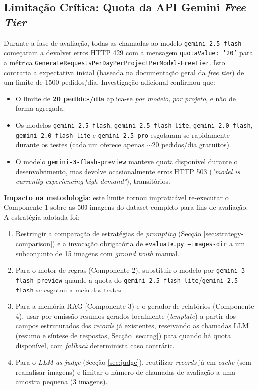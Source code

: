 \documentclass[conference]{IEEEtran}
\begin{document}
\subsection{Limitação Crítica: Quota da API Gemini \textit{Free Tier}}
\label{sec:quota}

Durante a fase de avaliação, todas as chamadas ao modelo
\texttt{gemini-2.5-flash} começaram a devolver erros HTTP 429 com a
mensagem \texttt{quotaValue: '20'} para a métrica
\texttt{GenerateRequestsPerDayPerProjectPerModel-FreeTier}. Isto contraria a
expectativa inicial (baseada na documentação geral da \textit{free tier}) de
um limite de 1500 pedidos/dia. Investigação adicional confirmou que:

\begin{itemize}
  \item O limite de \textbf{20 pedidos/dia} aplica-se \textit{por modelo, por
  projeto}, e não de forma agregada.
  \item Os modelos \texttt{gemini-2.5-flash}, \texttt{gemini-2.5-flash-lite},
  \texttt{gemini-2.0-flash}, \texttt{gemini-2.0-flash-lite} e
  \texttt{gemini-2.5-pro} esgotaram-se rapidamente durante os testes (cada um
  oferece apenas $\sim$20 pedidos/dia gratuitos).
  \item O modelo \texttt{gemini-3-flash-preview} manteve quota disponível
  durante o desenvolvimento, mas devolve ocasionalmente erros HTTP 503
  (\textit{"model is currently experiencing high demand"}), transitórios.
\end{itemize}

\textbf{Impacto na metodologia}: este limite tornou impraticável re-executar
o Componente 1 sobre as 500 imagens do dataset completo para fins de
avaliação. A estratégia adotada foi:

\begin{enumerate}
  \item Restringir a comparação de estratégias de \textit{prompting}
  (Secção \ref{sec:strategy-comparison}) e a invocação obrigatória de
  \texttt{evaluate.py --images-dir} a um subconjunto de 15 imagens com
  \textit{ground truth} manual.
  \item Para o motor de regras (Componente 2), substituir o modelo por
  \texttt{gemini-3-flash-preview} quando a quota do
  \texttt{gemini-2.5-flash-lite}/\texttt{gemini-2.5-flash} se esgotou a meio
  dos testes.
  \item Para a memória RAG (Componente 3) e o gerador de relatórios
  (Componente 4), usar por omissão resumos gerados localmente
  (\textit{template}) a partir dos campos estruturados dos \textit{records}
  já existentes, reservando as chamadas LLM (resumo e síntese de respostas,
  Secção \ref{sec:rag}) para quando há quota disponível, com \textit{fallback}
  determinista caso contrário.
  \item Para o \textit{LLM-as-judge} (Secção \ref{sec:judge}), reutilizar
  \textit{records} já em \textit{cache} (sem reanalisar imagens) e limitar o
  número de chamadas de avaliação a uma amostra pequena (3 imagens).
\end{enumerate}
\end{document}
